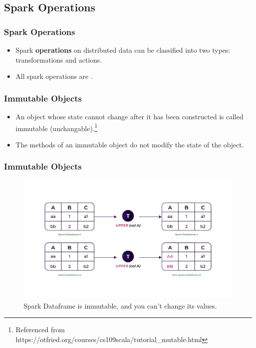 \subsection{Spark Operations}\label{subsec:spark-operations}
\begin{frame}
    \frametitle{Spark Operations}
    \begin{itemize}
        \item Spark \textbf{operations} on distributed data can be classified into two types: transformations
        and actions.
        \item All spark operations are \texttt{\color{blue}{immutable}}.
    \end{itemize}
\end{frame}
\begin{frame}
    \frametitle{Immutable Objects}
    \begin{itemize}
        \item An object whose state cannot change after it has been constructed is
        called immutable (unchangable).\footnote{Referenced from https://otfried.org/courses/cs109scala/tutorial_mutable.html}
        \item  The methods of an immutable object do not modify the state of the object.
    \end{itemize}
\end{frame}

\begin{frame}
    \frametitle{Immutable Objects}
    \begin{figure}
        \includegraphics[width=\textwidth,height=.7\textheight,keepaspectratio]{./Figures/chapter-04/Immutable_df}
        \caption{Spark Dataframe is immutable, and you can't change its values.}\label{fig:Immutable_df}
    \end{figure}
\end{frame}

